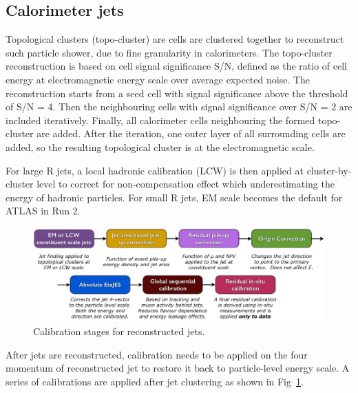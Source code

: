 \subsection{Calorimeter jets}
\label{sec:calo}
 \par Topological clusters (topo-cluster) are cells are clustered together to reconstruct such particle shower, due to fine granularity in calorimeters. 
 The topo-cluster reconstruction is based on cell signal significance S/N, defined as the ratio of cell energy at electromagnetic energy scale over average expected noise. 
 The reconstruction starts from a seed cell with signal significance above the threshold of S/N = 4. Then the neighbouring cells with signal significance over S/N = 2 are included iteratively.
 Finally, all calorimeter cells neighbouring the formed topo-cluster are added. After the iteration, one outer layer of all surrounding cells are added, 
 so the resulting topological cluster is at the electromagnetic scale.
\par For large R jets, a local hadronic calibration (LCW) is then applied at cluster-by-cluster level to correct for non-compensation effect which underestimating the energy of hadronic particles.
For small R jets, EM scale becomes the default for ATLAS in Run 2.
\begin{figure}[htbp]
 \begin{center}
 \includegraphics[width=1\textwidth]{chapters/c5/figures/jet_calib}
 \end{center}
 \caption{Calibration stages for reconstructed jets.}
 \label{fig:jet-calib}
\end{figure}
\par After jets are reconstructed, calibration needs to be applied on the four momentum of reconstructed jet to restore it back to particle-level energy scale.
A series of calibrations are applied after jet clustering as shown in Fig~\ref{fig:jet-calib}.


